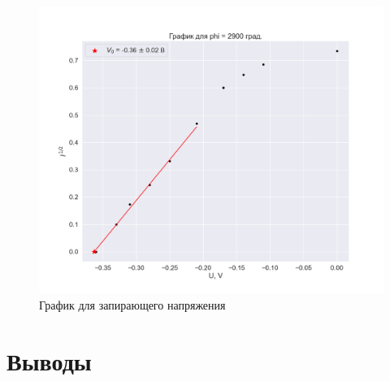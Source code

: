 \documentclass[a4paper, 12pt]{article}
\begin{document}
\begin{figure}[H]
    \centering
    \includegraphics[width=1\textwidth]{plot_zero10.png}
    \caption{График для запирающего напряжения}
\end{figure}

\section{Выводы}
\end{document}
